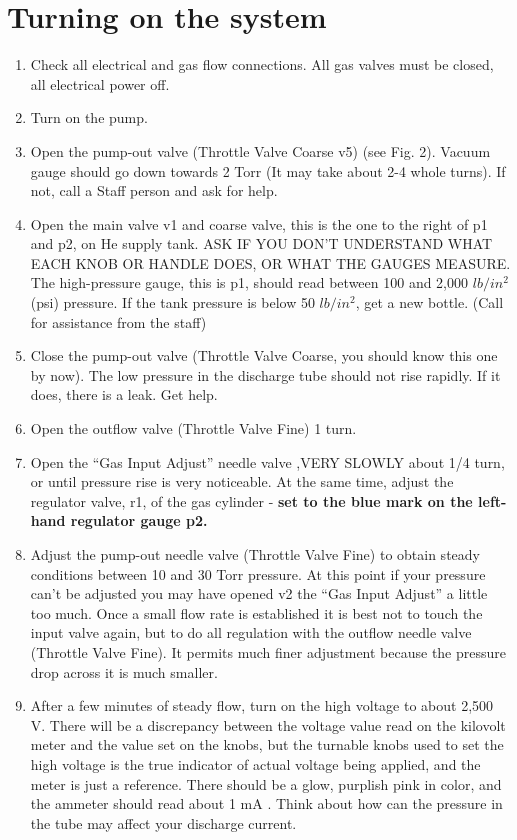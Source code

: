\documentclass{../lab}
\begin{document}
\section{Turning on the system}

\begin{enumerate}
    \item Check all electrical and gas flow connections. All gas valves must be closed, all electrical power off.
    \item Turn on the pump.
    \item Open the pump-out valve (Throttle Valve Coarse v5) (see Fig. 2). Vacuum gauge should go down towards 2 Torr (It may take about 2-4 whole turns). If not, call a Staff person and ask for help.
    \item Open the main valve v1 and coarse valve, this is the one to the right of p1 and p2, on He supply tank. ASK IF YOU DON'T UNDERSTAND WHAT EACH KNOB OR HANDLE DOES, OR WHAT THE GAUGES MEASURE. The high-pressure gauge, this is p1, should read between 100 and 2,000 $lb/in^2$ (psi) pressure. If the tank pressure is below 50 $lb/in^2$, get a new bottle. (Call for assistance from the staff)
    \item Close the pump-out valve (Throttle Valve Coarse, you should know this one by now). The low pressure in the discharge tube should not rise rapidly. If it does, there is a leak. Get help.
    \item Open the outflow valve (Throttle Valve Fine) 1 turn.
    \item Open the ``Gas Input Adjust'' needle valve ,VERY SLOWLY about 1/4 turn, or until pressure rise is very noticeable. At the same time, adjust the regulator valve, r1, of the gas cylinder - \textbf{set to the blue mark on the left-hand regulator gauge p2.}
    \item Adjust the pump-out needle valve (Throttle Valve Fine) to obtain steady conditions between 10 and 30 Torr pressure. At this point if your pressure can't be adjusted you may have opened v2 the ``Gas Input Adjust'' a little too much. Once a small flow rate is established it is best not to touch the input valve again, but to do all regulation with the outflow needle valve (Throttle Valve Fine). It permits much finer adjustment because the pressure drop across it is much smaller.
    \item After a few minutes of steady flow, turn on the high voltage to about 2,500 V. There will be a discrepancy between the voltage value read on the kilovolt meter and the value set on the knobs, but the turnable knobs used to set the high voltage is the true indicator of actual voltage being applied, and the meter is just a reference. There should be a glow, purplish pink in color, and the ammeter should read about 1 mA . Think about how can the pressure in the tube may affect your discharge current.

\end{enumerate}
\end{document}
